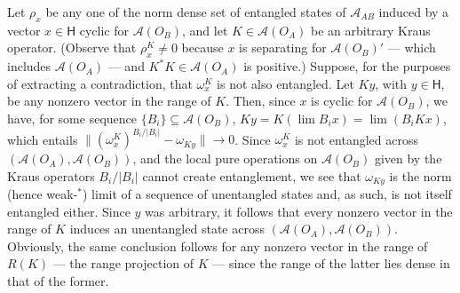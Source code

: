 \documentclass[12pt]{article}
\newcommand{\alg}[1]{\mbox{$\mathcal{#1}$}}
\newcommand{\hil}[1]{\mbox{$\mathsf{#1}$}}
\begin{document}
  Let $\rho_{x}$ be any one of the norm dense set of entangled states of
       $\alg{A}_{AB}$  induced by a vector $x\in\hil{H}$ cyclic for 
  $\alg{A}(O_{B})$, and let $K\in\alg{A}(O_{A})$ 
  be an arbitrary Kraus operator.  (Observe that  $\rho_{x}^{K}\not=0$ 
       because $x$ is separating for $\alg{A}(O_{B})'$ --- which includes 
       $\alg{A}(O_{A})$ --- and $K^{*}K\in\alg{A}(O_{A})$ is 
       positive.)  Suppose, for the purposes of extracting a contradiction, that  
       $\omega_{x}^{K}$ is not also entangled.
       Let $Ky$, with $y\in\hil{H}$, 
       be any nonzero vector in the range of $K$.  Then, since $x$ is 
       cyclic for $\alg{A}(O_{B})$, we have, for some sequence  
       $\{B_{i}\}\subseteq\alg{A}(O_{B})$,
       $Ky=K(\lim B_{i}x)=\lim(B_{i}Kx)$, which entails
                                           $\|(\omega_{x}^{K})^{B_{i}/|B_{i}|}-\omega_{Ky}\|\rightarrow 0$.
              Since $\omega_{x}^{K}$ is not entangled across 
       $(\alg{A}(O_{A}),\alg{A}(O_{B}))$, and the local pure 
       operations on $\alg{A}(O_{B})$ given by the Kraus operators 
       $B_{i}/|B_{i}|$ cannot 
       create entanglement, 
       we see that $\omega_{Ky}$ is the norm (hence weak-$^{*}$) limit of a 
       sequence of unentangled states and, as such, is not itself 
       entangled either.  Since $y$ was arbitrary, it 
       follows that every nonzero vector in the range of $K$ induces 
       an unentangled state across $(\alg{A}(O_{A}),\alg{A}(O_{B}))$.  
       Obviously, the same conclusion follows for any nonzero vector in the range of $R(K)$ --- the 
       range projection of $K$ --- since the range of the latter lies 
       dense in that of the former.  
       
\end{document}
